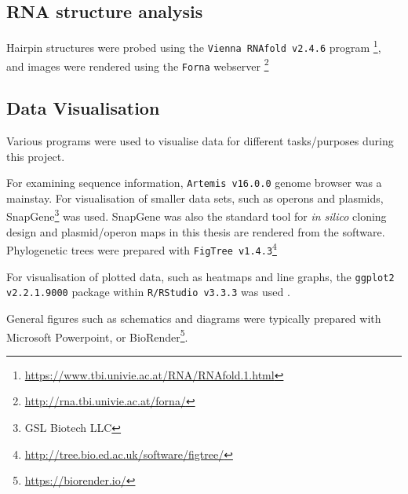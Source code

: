 \subsection{RNA structure analysis}
Hairpin structures were probed using the \texttt{Vienna RNAfold v2.4.6} program \citep{Lorenz2011}\footnote{\url{https://www.tbi.univie.ac.at/RNA/RNAfold.1.html}}, and images were rendered using the \texttt{Forna} webserver \citep{Kerpedjiev2015}\footnote{\url{http://rna.tbi.univie.ac.at/forna/}}

\subsection{Data Visualisation}
Various programs were used to visualise data for different tasks/purposes during this project.

For examining sequence information, \texttt{Artemis v16.0.0} \citep{Rutherford2000} genome browser was a mainstay. For visualisation of smaller data sets, such as operons and plasmids, SnapGene\footnote{GSL Biotech LLC} was used. SnapGene was also the standard tool for \emph{in silico} cloning design and plasmid/operon maps in this thesis are rendered from the software. Phylogenetic trees were prepared with \texttt{FigTree v1.4.3}\footnote{\url{http://tree.bio.ed.ac.uk/software/figtree/}}

For visualisation of plotted data, such as heatmaps and line graphs, the \texttt{ggplot2 v2.2.1.9000} package \citep{Wickham2009} within \texttt{R/RStudio v3.3.3} was used \citep{RStudioTeam2015, RCoreTeam2014}.

General figures such as schematics and diagrams were typically prepared with Microsoft Powerpoint, or BioRender\footnote{\url{https://biorender.io/}}.



